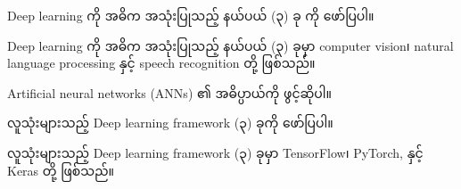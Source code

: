 \begin{answer}

\end{answer}

\begin{question}
   Deep learning ကို အဓိက အသုံးပြုသည့် နယ်ပယ် (၃) ခု ကို ဖော်ပြပါ။
\end{question}

\begin{answer}
    Deep learning ကို အဓိက အသုံးပြုသည့် နယ်ပယ် (၃) ခုမှာ  computer vision၊  natural language processing နှင့် speech recognition တို့ ဖြစ်သည်။
\end{answer}

\begin{question}
   Artificial neural networks (ANNs) ၏ အဓိပ္ပာယ်ကို ဖွင့်ဆိုပါ။
\end{question}

\begin{answer}

\end{answer}

\begin{question}
    လူသုံးများသည့် Deep learning framework (၃) ခုကို ဖော်ပြပါ။
\end{question}
\begin{answer}
    လူသုံးများသည့် Deep learning framework (၃) ခုမှာ TensorFlow၊ PyTorch, နှင့် Keras တို့ ဖြစ်သည်။
\end{answer} 